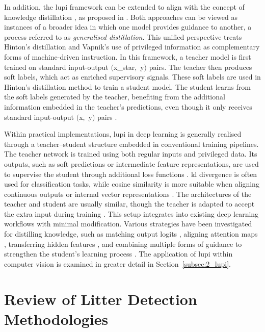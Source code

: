 In addition, the \gls{lupi} framework can be extended to align with the concept of knowledge distillation \cite{hinton_distillation}, as proposed in \cite{lupi_distillation}. Both approaches can be viewed as instances of a broader idea in which one model provides guidance to another, a process referred to as \textit{generalised distillation}. This unified perspective treats Hinton’s distillation \cite{hinton_distillation} and Vapnik’s use of privileged information \cite{lupi} as complementary forms of machine-driven instruction.
In this framework, a teacher model is first trained on standard input-output $($\gls{x_star}$ ,$ \gls{y}$)$  pairs. The teacher then produces soft labels, which act as enriched supervisory signals. These soft labels are used in Hinton’s distillation method to train a student model. The student learns from the soft labels generated by the teacher, benefiting from the additional information embedded in the teacher’s predictions, even though it only receives standard input-output $($\gls{x}$ ,$ \gls{y}$)$  pairs \cite{lupi_distillation}.

Within practical implementations, \gls{lupi} in deep learning is generally realised through a teacher–student structure embedded in conventional training pipelines. The teacher network is trained using both regular inputs and privileged data. Its outputs, such as soft predictions or intermediate feature representations, are used to supervise the student through additional loss functions \cite{lupi_nips}. \gls{kl} divergence is often used for classification tasks, while cosine similarity is more suitable when aligning continuous outputs or internal vector representations \cite{lab2wild, hinton_distillation}. The architectures of the teacher and student are usually similar, though the teacher is adapted to accept the extra input during training \cite{lab2wild, lupi_distillation}. This setup integrates into existing deep learning workflows with minimal modification. Various strategies have been investigated for distilling knowledge, such as matching output logits \cite{output_logits}, aligning attention maps \cite{attention_maps_distillation}, transferring hidden features \cite{lab2wild, distillation2}, and combining multiple forms of guidance to strengthen the student’s learning process \cite{distillation1, lupi_distillation}. The application of \gls{lupi} within computer vision is examined in greater detail in Section~\ref{subsec:2_lupi}.


\section{Review of Litter Detection Methodologies}
\label{sec:3_litter}


